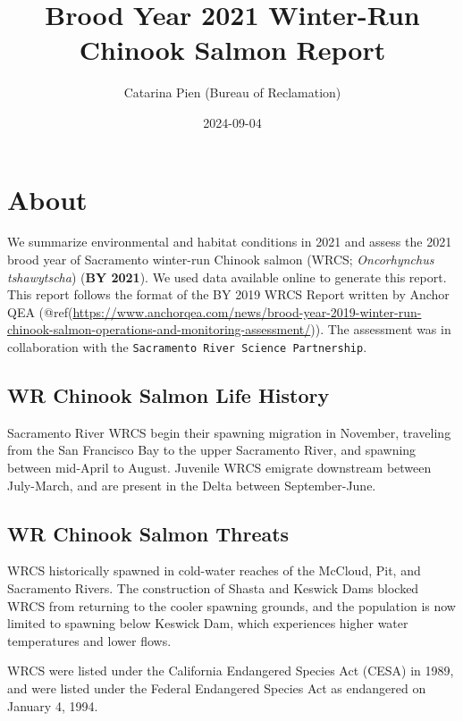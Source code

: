 \documentclass[
]{book}
\title{Brood Year 2021 Winter-Run Chinook Salmon Report}
\author{Catarina Pien (Bureau of Reclamation)}
\date{2024-09-04}
\theoremstyle{definition}
\theoremstyle{definition}
\theoremstyle{definition}
\theoremstyle{definition}
\theoremstyle{remark}
\begin{document}
\maketitle

{
\setcounter{tocdepth}{1}
\tableofcontents
}
\hypertarget{about}{%
\chapter{About}\label{about}}

We summarize environmental and habitat conditions in 2021 and assess the 2021 brood year of Sacramento winter-run Chinook salmon (WRCS; \emph{Oncorhynchus tshawytscha}) (\textbf{BY 2021}). We used data available online to generate this report. This report follows the format of the BY 2019 WRCS Report written by Anchor QEA (@ref(\url{https://www.anchorqea.com/news/brood-year-2019-winter-run-chinook-salmon-operations-and-monitoring-assessment/})). The assessment was in collaboration with the \texttt{Sacramento\ River\ Science\ Partnership}.

\hypertarget{wr-chinook-salmon-life-history}{%
\section{WR Chinook Salmon Life History}\label{wr-chinook-salmon-life-history}}

Sacramento River WRCS begin their spawning migration in November, traveling from the San Francisco Bay to the upper Sacramento River, and spawning between mid-April to August. Juvenile WRCS emigrate downstream between July-March, and are present in the Delta between September-June.

\hypertarget{wr-chinook-salmon-threats}{%
\section{WR Chinook Salmon Threats}\label{wr-chinook-salmon-threats}}

WRCS historically spawned in cold-water reaches of the McCloud, Pit, and Sacramento Rivers. The construction of Shasta and Keswick Dams blocked WRCS from returning to the cooler spawning grounds, and the population is now limited to spawning below Keswick Dam, which experiences higher water temperatures and lower flows.

WRCS were listed under the California Endangered Species Act (CESA) in 1989, and were listed under the Federal Endangered Species Act as endangered on January 4, 1994.
\end{document}
